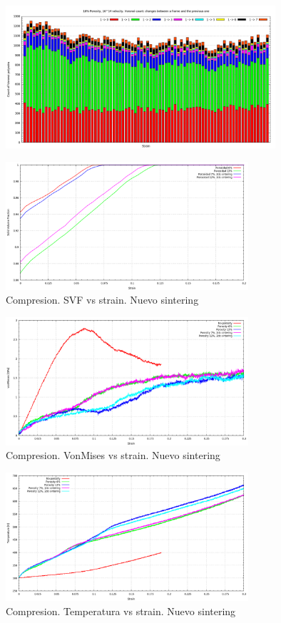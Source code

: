 \documentclass[10pt, oneside]{article} %
\begin{document}
\begin{figure}[H]
\centering
\includegraphics[width=10cm]{Figures/Porosidad_2vel_trac_voronoi_hist4.png}
\caption{}
\end{figure}

\begin{figure}[H]
\centering
\includegraphics[width=9cm]{Figures/Porosidad_newSinter_svf.png}
\caption{Compresion. SVF vs strain. Nuevo sintering}
\end{figure}

\begin{figure}[H]
\centering
\includegraphics[width=9cm]{Figures/Porosidad_newSinter_vm.png}
\caption{Compresion. VonMises vs strain. Nuevo sintering}
\end{figure}

\begin{figure}[H]
\centering
\includegraphics[width=9cm]{Figures/Porosidad_newSinter_temp.png}
\caption{Compresion. Temperatura vs strain. Nuevo sintering}
\end{figure}
\end{document}
